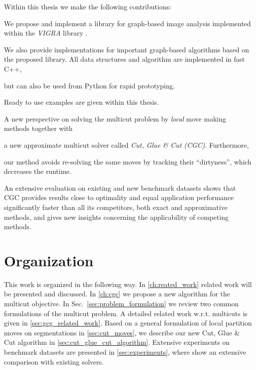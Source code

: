 Within this thesis we make the following contributions:

\begin{inparaenum}[(i)]
    \item 
    We propose and implement a library for graph-based image analysis 
        implemented within the \emph{VIGRA} library \cite{koethe_2000_phd_thesis,software_vigra}. 
    \item 
        We also provide implementations for important graph-based algorithms based on the proposed library.
        All data structures and algorithm are implemented in fast C++,
    \item but can also be used from Python for rapid prototyping.
    \item Ready to use examples are given within this thesis.




    \item
      A new perspective on solving the multicut problem by
      \emph{local} move making methods together with
      \item
      a new approximate multicut solver called
      \emph{Cut, Glue \& Cut (CGC)}. Furthermore,
      \item our method avoids re-solving the same moves
      by tracking their ``dirtyness'', which decreases the runtime. 
      \item
      An extensive evaluation on existing and new benchmark datasets shows
      that CGC provides results close to optimality
      and equal application performance significantly faster than all its
      competitors, both exact
      and approximative methods, and gives new insights concerning the applicability
      of competing methods.
\end{inparaenum}




\section{Organization}

This work is organized in the following way.
In \cref{ch:reated_work} related work will be presented and  discussed.
In \cref{ch:cgc} we propose a new algorithm for the multicut objective.
In Sec.~\ref{sec:problem_formulation} we review two common formulations
of the multicut problem. 
A detailed related work w.r.t. multicuts is given in \cref{sec:gcg_related_work}.
Based on a general formulation of local partition moves on segmentations in
\cref{sec:cut_moves},
we describe our new Cut, Glue \& Cut algorithm
in \cref{sec:cut_glue_cut_algorithm}. Extensive experiments
on benchmark datasets are presented in \cref{sec:experiments},
where show an extensive comparison  with existing solvers.

